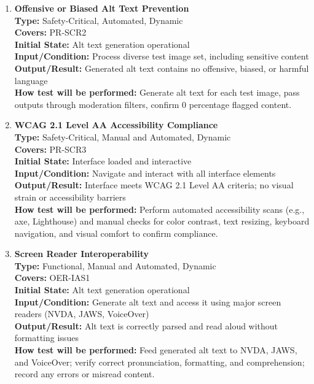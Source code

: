 \documentclass[12pt, titlepage]{article}
\begin{document}
\begin{enumerate}[label=NFR-ST \arabic*., wide=0pt, leftmargin=*]
  \item \textbf{Offensive or Biased Alt Text Prevention} \\[2mm]
    \textbf{Type:} Safety-Critical, Automated, Dynamic \\
    \textbf{Covers:} PR-SCR2 \\
    \textbf{Initial State:} Alt text generation operational \\
    \textbf{Input/Condition:} Process diverse test image set,
    including sensitive content \\
    \textbf{Output/Result:} Generated alt text contains no offensive,
    biased, or harmful language \\[2mm]
    \textbf{How test will be performed:}
    Generate alt text for each test image, pass outputs through
    moderation filters, confirm 0 percentage flagged content.

  \item \textbf{WCAG 2.1 Level AA Accessibility Compliance} \\[2mm]
    \textbf{Type:} Safety-Critical, Manual and Automated, Dynamic \\
    \textbf{Covers:} PR-SCR3 \\
    \textbf{Initial State:} Interface loaded and interactive \\
    \textbf{Input/Condition:} Navigate and interact with all
    interface elements \\
    \textbf{Output/Result:} Interface meets WCAG 2.1 Level AA
    criteria; no visual strain or accessibility barriers \\[2mm]
    \textbf{How test will be performed:}
    Perform automated accessibility scans (e.g., axe, Lighthouse) and
    manual checks for color contrast, text resizing, keyboard
    navigation, and visual comfort to confirm compliance.

  \item \textbf{Screen Reader Interoperability} \\[2mm]
    \textbf{Type:} Functional, Manual and Automated, Dynamic \\
    \textbf{Covers:} OER-IAS1 \\
    \textbf{Initial State:} Alt text generation operational \\
    \textbf{Input/Condition:} Generate alt text and access it using
    major screen readers (NVDA, JAWS, VoiceOver) \\
    \textbf{Output/Result:} Alt text is correctly parsed and read
    aloud without formatting issues \\[2mm]
    \textbf{How test will be performed:}
    Feed generated alt text to NVDA, JAWS, and VoiceOver; verify
    correct pronunciation, formatting, and comprehension; record any
    errors or misread content.


\end{enumerate}
\end{document}
